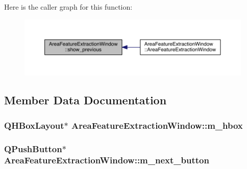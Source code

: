 Here is the caller graph for this function\+:\nopagebreak
\begin{figure}[H]
\begin{center}
\leavevmode
\includegraphics[width=350pt]{class_area_feature_extraction_window_ab0f1fc10645d98e916faea9a94cf2a15_icgraph}
\end{center}
\end{figure}




\subsection{Member Data Documentation}
\hypertarget{class_area_feature_extraction_window_a5664dd1b2be2c4726cc016ced8828fc3}{
\subsubsection[{m\+\_\+hbox}]{\setlength{\rightskip}{0pt plus 5cm}Q\+H\+Box\+Layout$\ast$ Area\+Feature\+Extraction\+Window\+::m\+\_\+hbox\hspace{0.3cm}{\ttfamily [private]}}}\label{class_area_feature_extraction_window_a5664dd1b2be2c4726cc016ced8828fc3}
\hypertarget{class_area_feature_extraction_window_aeac146ce4d4824383ae3387200771c8c}{
\subsubsection[{m\+\_\+next\+\_\+button}]{\setlength{\rightskip}{0pt plus 5cm}Q\+Push\+Button$\ast$ Area\+Feature\+Extraction\+Window\+::m\+\_\+next\+\_\+button\hspace{0.3cm}{\ttfamily [private]}}}\label{class_area_feature_extraction_window_aeac146ce4d4824383ae3387200771c8c}
